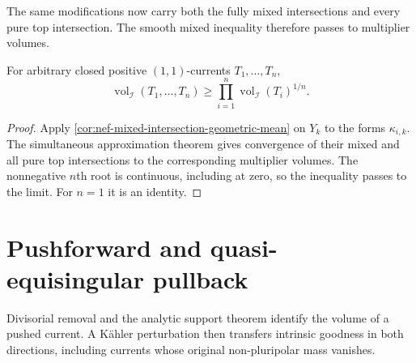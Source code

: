 The same modifications now carry both the fully mixed intersections and every pure top intersection. The smooth mixed inequality therefore passes to multiplier volumes.

\begin{corollary}\label{cor:mixed-multiplier-volume-log-concavity}
For arbitrary closed positive $(1,1)$-currents $T_1,\ldots,T_n$,
\[
 \operatorname{vol}_{\mathcal I}(T_1,\ldots,T_n)
             \geq\prod_{i=1}^n\operatorname{vol}_{\mathcal I}(T_i)^{1/n}.
\]
\end{corollary}
\begin{proof}
Apply \cref{cor:nef-mixed-intersection-geometric-mean} on $Y_k$ to the forms $\kappa_{i,k}$. The simultaneous approximation theorem gives convergence of their mixed and all pure top intersections to the corresponding multiplier volumes. The nonnegative $n$th root is continuous, including at zero, so the inequality passes to the limit. For $n=1$ it is an identity.
\end{proof}


\section{Pushforward and quasi-equisingular pullback}
\label{sec:volume-goodness-modifications}
Divisorial removal and the analytic support theorem identify the volume of a pushed current. A K\"ahler perturbation then transfers intrinsic goodness in both directions, including currents whose original non-pluripolar mass vanishes.

